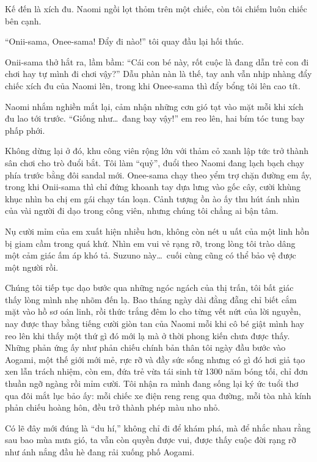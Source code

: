 \documentclass[../main.tex]{subfiles}
\begin{document}
Kế đến là xích đu. Naomi ngồi lọt thỏm trên một chiếc, còn tôi chiếm luôn chiếc bên cạnh.

``Onii-sama, Onee-sama! Đẩy đi nào!'' tôi quay đầu lại hối thúc.

Onii-sama thở hắt ra, lầm bầm: ``Cái con bé này, rốt cuộc là đang dẫn trẻ con đi chơi hay tự mình đi chơi vậy?'' Dẫu phàn nàn là thế, tay anh vẫn nhịp nhàng đẩy chiếc xích đu của Naomi lên, trong khi Onee-sama thì đẩy bổng tôi lên cao tít.

Naomi nhắm nghiền mắt lại, cảm nhận những cơn gió tạt vào mặt mỗi khi xích đu lao tới trước. ``Giống như\dots\ đang bay vậy!'' em reo lên, hai bím tóc tung bay phấp phới.

Không dừng lại ở đó, khu công viên rộng lớn với thảm cỏ xanh lập tức trở thành sân chơi cho trò đuổi bắt. Tôi làm ``quỷ'', đuổi theo Naomi đang lạch bạch chạy phía trước bằng đôi sandal mới. Onee-sama chạy theo yểm trợ chặn đường em ấy, trong khi Onii-sama thì chỉ đứng khoanh tay dựa lưng vào gốc cây, cười khùng khục nhìn ba chị em gái chạy tán loạn. Cảnh tượng ồn ào ấy thu hút ánh nhìn của vài người đi dạo trong công viên, nhưng chúng tôi chẳng ai bận tâm.

Nụ cười mỉm của em xuất hiện nhiều hơn, không còn nét u uất của một linh hồn bị giam cầm trong quá khứ. Nhìn em vui vẻ rạng rỡ, trong lòng tôi trào dâng một cảm giác ấm áp khó tả. Suzuno này\dots\ cuối cùng cũng có thể bảo vệ được một người rồi.

\ct

Chúng tôi tiếp tục dạo bước qua những ngóc ngách của thị trấn, tôi bất giác thấy lòng mình nhẹ nhõm đến lạ. Bao tháng ngày dài đằng đẵng chỉ biết cắm mặt vào hồ sơ oán linh, rồi thức trắng đêm lo cho từng vết nứt của lời nguyền, nay được thay bằng tiếng cười giòn tan của Naomi mỗi khi cô bé giật mình hay reo lên khi thấy một thứ gì đó mới lạ mà ở thời phong kiến chưa được thấy. Những phản ứng ấy như phản chiếu chính bản thân tôi ngày đầu bước vào Aogami, một thế giới mới mẻ, rực rỡ và đầy sức sống nhưng có gì đó hơi giả tạo xen lẫn trách nhiệm, còn em, đứa trẻ vừa tái sinh từ 1300 năm bóng tối, chỉ đơn thuần ngỡ ngàng rồi mỉm cười. Tôi nhận ra mình đang sống lại ký ức tuổi thơ qua đôi mắt lục bảo ấy: mỗi chiếc xe điện reng reng qua đường, mỗi tòa nhà kính phản chiếu hoàng hôn, đều trở thành phép màu nho nhỏ.

Có lẽ đây mới đúng là ``du hí,'' không chỉ đi để khám phá, mà để nhắc nhau rằng sau bao mùa mưa gió, ta vẫn còn quyền được vui, được thấy cuộc đời rạng rỡ như ánh nắng đầu hè đang rải xuống phố Aogami.
\end{document}
